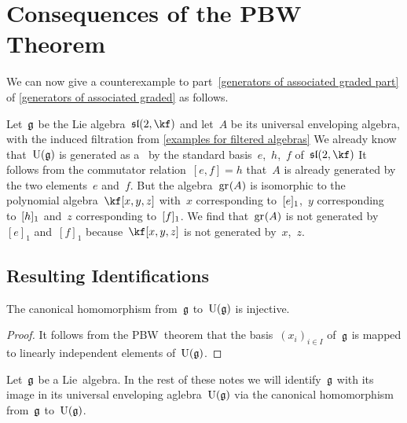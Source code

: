 \section{Consequences of the PBW Theorem}


\begin{example}
  \label{converse to warning about generating set for the associated graded}
  We can now give a counterexample to part~\ref{generators of associated graded part} of \cref{generators of associated graded} as follows.

  Let~$\mathfrak{g}$ be the Lie algebra~$\sllie(2, \kf)$ and let~$A$ be its universal enveloping algebra, with the induced filtration from \cref{examples for filtered algebras}
  We already know that~$\operatorname{U}(\mathfrak{g})$ is generated as a~\algebra{$\kf$} by the standard basis~$e$,~$h$,~$f$ of~$\sllie(2, \kf)$
  It follows from the commutator relation~$[e,f] = h$ that~$A$ is already generated by the two elements~$e$ and~$f$.
  But the algebra~$\gr(A)$ is isomorphic to the polynomial algebra~$\kf[x, y, z]$ with~$x$ corresponding to~$\lbrack e \rbrack_1$,~$y$ corresponding to~$\lbrack h\rbrack_1$ and~$z$ corresponding to~$\lbrack f\rbrack_1$.
  We find that~$\gr(A)$ is not generated by~$[e]_1$ and~$[f]_1$ because~$\kf[x,y,z]$ is not generated by~$x$,~$z$.
\end{example}


\subsection*{Resulting Identifications}

\begin{proposition}
  \label{embedding into uea}
  The canonical homomorphism from~$\mathfrak{g}$ to~$\operatorname{U}(\mathfrak{g})$ is injective.
\end{proposition}


\begin{proof}
  It follows from the PBW~theorem that the basis~$(x_i)_{i \in I}$ of~$\mathfrak{g}$ is mapped to linearly independent elements of~$\operatorname{U}(\mathfrak{g})$.
\end{proof}


\begin{convention}
  \label{identification of lie algebra with image in its uea}
  Let~$\mathfrak{g}$ be a Lie~algebra.
  In the rest of these notes we will identify~$\mathfrak{g}$ with its image in its universal enveloping aglebra~$\operatorname{U}(\mathfrak{g})$ via the canonical homomorphism from~$\mathfrak{g}$ to~$\operatorname{U}(\mathfrak{g})$. 
\end{convention}


